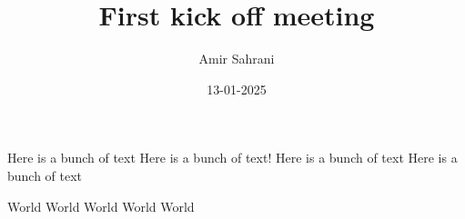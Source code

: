 \documentclass[10pt,dvipsnames]{beamer}
\title{First kick off meeting}
\author{Amir Sahrani}
\date{13-01-2025}
\begin{document}
\begingroup
{} %
	\frame[plain, s]{\titlepage} %
\endgroup

\begin{frame}
   Here is a bunch of text
   Here is a bunch of text!
   Here is a bunch of text
   Here is a bunch of text
   	
\end{frame}

\begin{frame}
    World
    World
    World
    World
    World
\end{frame}
\end{document}
